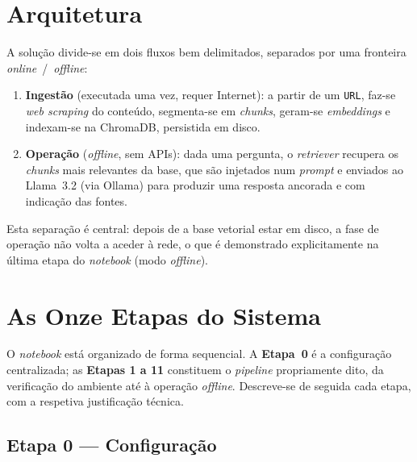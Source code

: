 \documentclass[]{ceurart}
\begin{document}
\section{Arquitetura}
\label{sec:arquitetura}

A solução divide-se em dois fluxos bem delimitados, separados por uma fronteira
\emph{online}~/~\emph{offline}:

\begin{enumerate}
  \item \textbf{Ingestão} (executada uma vez, requer Internet): a partir de um
        \texttt{URL}, faz-se \emph{web scraping} do conteúdo, segmenta-se em
        \emph{chunks}, geram-se \emph{embeddings} e indexam-se na ChromaDB,
        persistida em disco.
  \item \textbf{Operação} (\emph{offline}, sem APIs): dada uma pergunta, o
        \emph{retriever} recupera os \emph{chunks} mais relevantes da base, que
        são injetados num \emph{prompt} e enviados ao Llama~3.2 (via Ollama) para
        produzir uma resposta ancorada e com indicação das fontes.
\end{enumerate}

Esta separação é central: depois de a base vetorial estar em disco, a fase de
operação não volta a aceder à rede, o que é demonstrado explicitamente na última
etapa do \emph{notebook} (modo \emph{offline}).

\section{As Onze Etapas do Sistema}
\label{sec:etapas}

O \emph{notebook} está organizado de forma sequencial. A \textbf{Etapa~0} é a
configuração centralizada; as \textbf{Etapas 1 a 11} constituem o \emph{pipeline}
propriamente dito, da verificação do ambiente até à operação \emph{offline}.
Descreve-se de seguida cada etapa, com a respetiva justificação técnica.

\subsection*{Etapa 0 --- Configuração}
\end{document}
